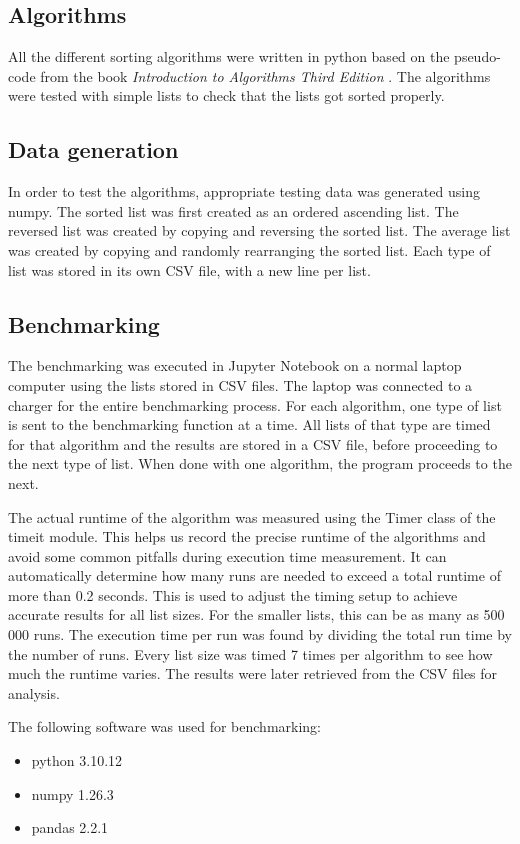 \documentclass[sigconf, nonacm, natbib, screen, balance=False, 9.5pt]{acmart}
\begin{document}
\subsection{Algorithms}
All the different sorting algorithms were written in python based on the pseudo-code from the book \textit{Introduction to Algorithms
Third Edition} \cite{CLRS_2009}. The algorithms were tested with simple lists to check that the lists got sorted properly.

\subsection{Data generation}
In order to test the algorithms, appropriate testing data was generated using numpy. The sorted list was first created as an ordered ascending list. The reversed list was created by copying and reversing the sorted list. The average list was created by copying and randomly rearranging the sorted list. Each type of list was stored in its own CSV file, with a new line per list.

\subsection{Benchmarking}
The benchmarking was executed in Jupyter Notebook on a normal laptop computer using the lists stored in CSV files. The laptop was connected to a charger for the entire benchmarking process. For each algorithm, one type of list is sent to the benchmarking function at a time. All lists of that type are timed for that algorithm and the results are stored in a CSV file, before proceeding to the next type of list. When done with one algorithm, the program proceeds to the next. 

The actual runtime of the algorithm was measured using the Timer class of the timeit module. This helps us record the precise runtime of the algorithms and avoid some common pitfalls during execution time measurement. It can automatically determine how many runs are needed to exceed a total runtime of more than 0.2 seconds\cite{Timeit}. This is used to adjust the timing setup to achieve accurate results for all list sizes. For the smaller lists, this can be as many as 500 000 runs. The execution time per run was found by dividing the total run time by the number of runs. Every list size was timed 7 times per algorithm to see how much the runtime varies. The results were later retrieved from the CSV files for analysis.

The following software was used for benchmarking: 
\begin{itemize}
\item python 3.10.12
\item numpy 1.26.3
\item pandas 2.2.1
\end{itemize}
\end{document}
